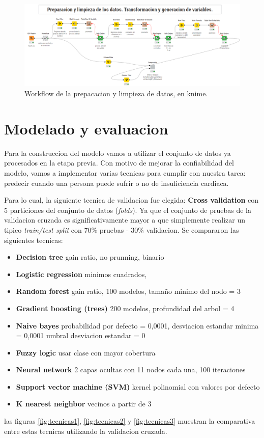 \documentclass[12pt, letterpaper]{article}
\begin{document}
\begin{figure}
    \centering
    \includegraphics[scale=0.37]{entrega3.png}
    \caption{Workflow de la prepacacion y limpieza de datos, en knime.}
    \label{fig:Workflow3}
\end{figure}

\section{Modelado y evaluacion}
Para la construccion del modelo vamos a utilizar el conjunto de datos ya procesados en la 
etapa previa. 
Con motivo de mejorar la confiabilidad del modelo, vamos a implementar varias tecnicas para 
cumplir con nuestra tarea: predecir cuando una persona puede sufrir o no de 
insuficiencia cardiaca. 

Para lo cual, la siguiente tecnica de validacion fue elegida: \textbf{Cross validation}
con 5 particiones del conjunto de datos (\textit{folds}). 
Ya que el conjunto de pruebas de la validacion cruzada es significativamente mayor a que 
simplemente realizar un tipico \textit{train/test split} con 70\% pruebas - 30\% validacion. 
Se compararon las siguientes tecnicas:
\begin{itemize}
    \item{\textbf{Decision tree} gain ratio, no prunning, binario} 
    \item{\textbf{Logistic regression} minimos cuadrados, } 
    \item{\textbf{Random forest} gain ratio, 100 modelos, tamaño minimo del nodo = 3} 
    \item{\textbf{Gradient boosting (trees)} 200 modelos, profundidad del arbol = 4} 
    \item{\textbf{Naive bayes} probabilidad por defecto = 0,0001, desviacion estandar minima = 0,0001
    umbral desviacion estandar = 0} 
    \item{\textbf{Fuzzy logic} usar clase con mayor cobertura} 
    \item{\textbf{Neural network} 2 capas ocultas con 11 nodos cada una, 100 iteraciones} 
    \item{\textbf{Support vector machine (SVM)} kernel polinomial con valores por defecto} 
    \item{\textbf{K nearest neighbor} vecinos a partir de 3}
\end{itemize}
las figuras \ref{fig:tecnicas1}, \ref{fig:tecnicas2} y \ref{fig:tecnicas3} muestran la comparativa
entre estas tecnicas utilizando la validacion cruzada.
\end{document}
